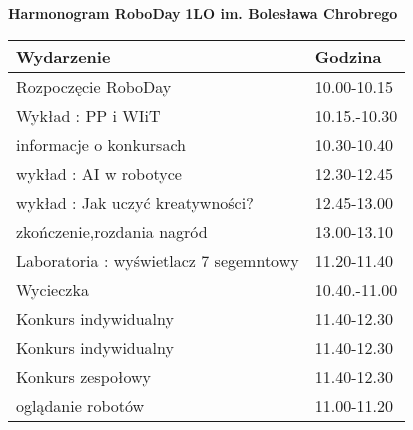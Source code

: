 \documentclass{article}
\begin{document}
\begin{center}
\Large\textbf{Harmonogram RoboDay}
\large\textbf{1LO im. Bolesława Chrobrego}
\end{center}
\vspace{1cm}
\begin{center}
\begin{tabular}{|l|l|}
\hline
\textbf{Wydarzenie} & \textbf{Godzina} \\
\hline
Rozpoczęcie RoboDay & 10.00-10.15 \\
\hline
Wykład : PP i WIiT & 10.15.-10.30 \\
\hline
informacje o konkursach & 10.30-10.40 \\
\hline
wykład : AI w robotyce & 12.30-12.45 \\
\hline
wykład : Jak uczyć kreatywności? & 12.45-13.00 \\
\hline
zkończenie,rozdania nagród & 13.00-13.10 \\
\hline
Laboratoria : wyświetlacz 7 segemntowy & 11.20-11.40 \\
\hline
Wycieczka  & 10.40.-11.00 \\
\hline
Konkurs indywidualny & 11.40-12.30 \\
\hline
Konkurs indywidualny & 11.40-12.30 \\
\hline
Konkurs zespołowy & 11.40-12.30 \\
\hline
oglądanie robotów & 11.00-11.20 \\
\hline
\end{tabular}
\end{center}
\end{document}
